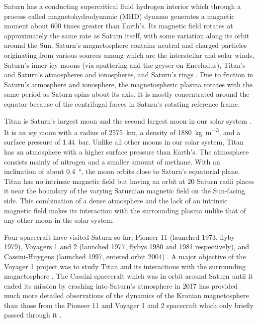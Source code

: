 \documentclass[12pt, parskip=full*, abstract]{scrartcl}
\begin{document}
Saturn has a conducting supercritical fluid hydrogen interior which through a process called magnetohydrodynamic (MHD) dynamo generates a magnetic moment about 600 times greater than Earth's. Its magnetic field rotates at approximately the same rate as Saturn itself, with some variation along its orbit around the Sun. Saturn's magnetosphere contains neutral and charged particles originating from various sources among which are the interstellar and solar winds, Saturn's inner icy moons (via sputtering and the geyser on Enceladus), Titan's and Saturn's atmospheres and ionospheres, and Saturn's rings \parencite{solar-system-magnetospheres}. Due to friction in Saturn's atmosphere and ionosphere, the magnetospheric plasma rotates with the same period as Saturn spins about its axis. It is mostly concentrated around the equator because of the centrifugal forces in Saturn's rotating reference frame.

Titan is Saturn's largest moon and the second largest moon in our solar system \parencite{fundamental-planetary-science}. It is an icy moon with a radius of \SI{2575}{\kilo\metre}, a density of \SI{1880}{\kilogram\per\metre^3}, and a surface pressure of \SI{1.44}{\bar}. Unlike all other moons in our solar system, Titan has an atmosphere with a higher surface pressure than Earth's. The atmosphere consists mainly of nitrogen and a smaller amount of methane. With an inclination of about \SI{0.4}{\degree}, the moon orbits close to Saturn's equatorial plane. Titan has no intrinsic magnetic field but having an orbit at 20 Saturn radii places it near the boundary of the varying Saturnian magnetic field on the Sun-facing side. This combination of a dense atmosphere and the lack of an intrinsic magnetic field makes its interaction with the surrounding plasma unlike that of any other moon in the solar system. 

Four spacecraft have visited Saturn so far; Pioneer 11 (launched 1973, flyby 1979), Voyagers 1 and 2 (launched 1977, flybys 1980 and 1981 respectively), and Cassini-Huygens (launched 1997, entered orbit 2004) \parencite{encyclopedia-missions,cassini-2019}. A major objective of the Voyager 1 project was to study Titan and its interactions with the surrounding magnetosphere \parencite{hartle-1982}. The Cassini spacecraft which was in orbit around Saturn until it ended its mission by crashing into Saturn's atmosphere in 2017 \parencite{cassini-2019} has provided much more detailed observations of the dynamics of the Kronian magnetosphere than those from the Pioneer 11 and Voyager 1 and 2 spacecraft which only briefly passed through it \parencite{encyclopedia-magnetospheres}. 
\end{document}
